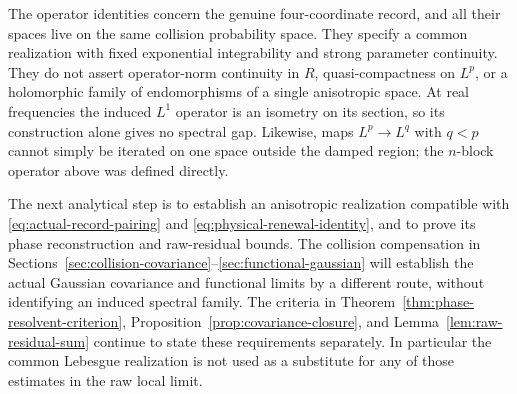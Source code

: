 \begin{remark}
The operator identities concern the genuine four-coordinate record,
and all their spaces live on the same collision probability space.
They specify a common realization with fixed exponential integrability
and strong parameter continuity. They do not assert operator-norm
continuity in $R$, quasi-compactness on $L^p$, or a holomorphic family of
endomorphisms of a single anisotropic space. At real frequencies the
induced $L^1$ operator is an isometry on its section, so its construction
alone gives no spectral gap. Likewise, maps $L^p\to L^q$ with $q<p$
cannot simply be iterated on one space outside the damped region; the
$n$-block operator above was defined directly.

The next analytical step is to establish an anisotropic realization
compatible with \eqref{eq:actual-record-pairing} and
\eqref{eq:physical-renewal-identity}, and to prove its phase
reconstruction and raw-residual bounds. The collision compensation
in Sections~\ref{sec:collision-covariance}--\ref{sec:functional-gaussian}
will establish the actual Gaussian covariance and functional limits
by a different route, without identifying an induced spectral family. The criteria in
Theorem~\ref{thm:phase-resolvent-criterion},
Proposition~\ref{prop:covariance-closure}, and
Lemma~\ref{lem:raw-residual-sum} continue to state these requirements
separately. In particular the common Lebesgue realization is not used
as a substitute for any of those estimates in the raw local limit.
\end{remark}
